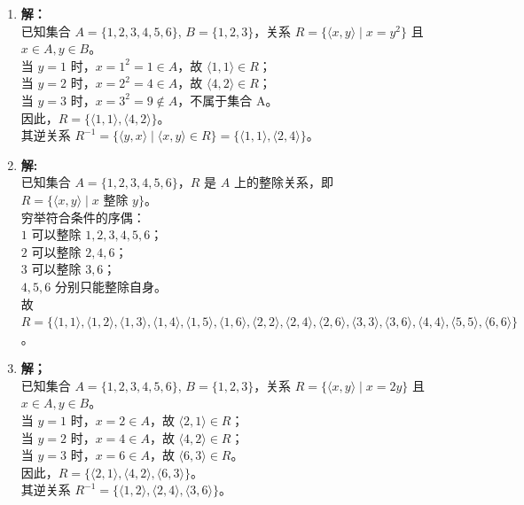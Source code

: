 \begin{enumerate}
	\item \textbf{解：}\\
	已知集合 $A = \{1, 2, 3, 4, 5, 6\}$, $B = \{1, 2, 3\}$，关系 $R = \{\langle x, y \rangle \mid x = y^2\}$ 且 $x \in A, y \in B$。\\
	当 $y = 1$ 时，$x = 1^2 = 1 \in A$，故 $\langle 1, 1 \rangle \in R$；\\
	当 $y = 2$ 时，$x = 2^2 = 4 \in A$，故 $\langle 4, 2 \rangle \in R$；\\
	当 $y = 3$ 时，$x = 3^2 = 9 \notin A$，不属于集合 A。\\
	因此，$R = \{\langle 1, 1 \rangle, \langle 4, 2 \rangle\}$。\\
	其逆关系 $R^{-1} = \{\langle y, x \rangle \mid \langle x, y \rangle \in R\} = \{\langle 1, 1 \rangle, \langle 2, 4 \rangle\}$。
	
	\vspace{1em}
	
	\item \textbf{解:}\\
	已知集合 $A = \{1, 2, 3, 4, 5, 6\}$，$R$ 是 $A$ 上的整除关系，即 $R = \{\langle x, y \rangle \mid x \text{ 整除 } y \}$。\\
	穷举符合条件的序偶：\\
	$1$ 可以整除 $1, 2, 3, 4, 5, 6$；\\
	$2$ 可以整除 $2, 4, 6$；\\
	$3$ 可以整除 $3, 6$；\\
	$4, 5, 6$ 分别只能整除自身。\\
	故 $R = \{\langle 1, 1 \rangle, \langle 1, 2 \rangle, \langle 1, 3 \rangle, \langle 1, 4 \rangle, \langle 1, 5 \rangle, \langle 1, 6 \rangle, \langle 2, 2 \rangle, \langle 2, 4 \rangle, \langle 2, 6 \rangle, \langle 3, 3 \rangle, \langle 3, 6 \rangle, \langle 4, 4 \rangle, \langle 5, 5 \rangle, \langle 6, 6 \rangle\}$。
	
	\vspace{1em}
	
	\item \textbf{解；}\\
	已知集合 $A = \{1, 2, 3, 4, 5, 6\}$, $B = \{1, 2, 3\}$，关系 $R = \{\langle x, y \rangle \mid x = 2y\}$ 且 $x \in A, y \in B$。\\
	当 $y = 1$ 时，$x = 2 \in A$，故 $\langle 2, 1 \rangle \in R$；\\
	当 $y = 2$ 时，$x = 4 \in A$，故 $\langle 4, 2 \rangle \in R$；\\
	当 $y = 3$ 时，$x = 6 \in A$，故 $\langle 6, 3 \rangle \in R$。\\
	因此，$R = \{\langle 2, 1 \rangle, \langle 4, 2 \rangle, \langle 6, 3 \rangle\}$。\\
	其逆关系 $R^{-1} = \{\langle 1, 2 \rangle, \langle 2, 4 \rangle, \langle 3, 6 \rangle\}$。
	

\end{enumerate}
